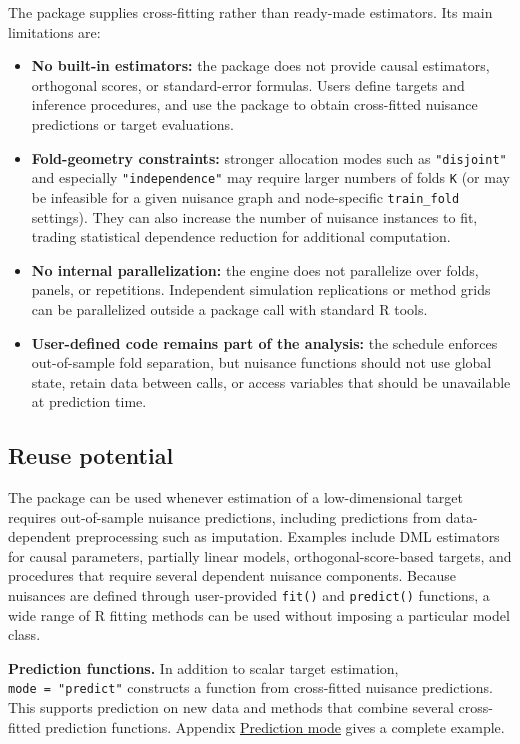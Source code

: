 The package supplies cross-fitting rather than ready-made estimators. Its main limitations are:

\begin{itemize}
\tightlist
\item
  \textbf{No built-in estimators:} the package does not provide causal estimators, orthogonal scores, or standard-error formulas. Users define targets and inference procedures, and use the package to obtain cross-fitted nuisance predictions or target evaluations.
\item
  \textbf{Fold-geometry constraints:} stronger allocation modes such as \texttt{"disjoint"} and especially \texttt{"independence"} may require larger numbers of folds \texttt{K} (or may be infeasible for a given nuisance graph and node-specific \texttt{train\_fold} settings). They can also increase the number of nuisance instances to fit, trading statistical dependence reduction for additional computation.
\item
  \textbf{No internal parallelization:} the engine does not parallelize over folds, panels, or repetitions. Independent simulation replications or method grids can be parallelized outside a package call with standard R tools.
\item
  \textbf{User-defined code remains part of the analysis:} the schedule enforces out-of-sample fold separation, but nuisance functions should not use global state, retain data between calls, or access variables that should be unavailable at prediction time.
\end{itemize}

\subsection{Reuse potential}\label{reuse-potential}

The package can be used whenever estimation of a low-dimensional target requires out-of-sample nuisance predictions, including predictions from data-dependent preprocessing such as imputation. Examples include DML estimators for causal parameters, partially linear models, orthogonal-score-based targets, and procedures that require several dependent nuisance components. Because nuisances are defined through user-provided \texttt{fit()} and \texttt{predict()} functions, a wide range of R fitting methods can be used without imposing a particular model class.

\textbf{Prediction functions.} In addition to scalar target estimation, \texttt{mode\ =\ "predict"} constructs a function from cross-fitted nuisance predictions. This supports prediction on new data and methods that combine several cross-fitted prediction functions. Appendix \hyperref[app:predict]{Prediction mode} gives a complete example.

